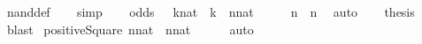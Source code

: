\begin{isabellebody}
\ nand{\isacharunderscore}{\kern0pt}def\isanewline
\ \ \isamarkupfalse%
\ simp\isanewline
\ \ \isamarkupfalse%
%
\endisatagproof
{\isafoldproof}%
%
\isadelimproof
\isanewline
%
\endisadelimproof
\isanewline
\isanewline
\isanewline
\isanewline
\isanewline
{}\isamarkupfalse%
\ {\isachardoublequoteopen}odds{}{\isachardoublequoteclose}{\isacharcolon}{\kern0pt}\ {\isachardoublequoteopen}\ {\isasymexists}\ {\isacharparenleft}{\kern0pt}k{\isacharcolon}{\kern0pt}{\isacharcolon}{\kern0pt}nat{\isacharparenright}{\kern0pt}\ {\isachardot}{\kern0pt}\ {}{\isacharasterisk}{\kern0pt}k{\isacharplus}{\kern0pt}{}\ {\isachargreater}{\kern0pt}\ {\isacharparenleft}{\kern0pt}n{\isacharcolon}{\kern0pt}{\isacharcolon}{\kern0pt}nat{\isacharparenright}{\kern0pt}{\isachardoublequoteclose}\isanewline
%
\isadelimproof
%
\endisadelimproof
%
\isatagproof
{}\isamarkupfalse%
\ {\isacharminus}{\kern0pt}\isanewline
\ \ \isamarkupfalse%
\ {\isachardoublequoteopen}{}{\isacharasterisk}{\kern0pt}n{\isacharplus}{\kern0pt}{}\ {\isachargreater}{\kern0pt}\ n{\isachardoublequoteclose}\ \isamarkupfalse%
\ auto\isanewline
\ \ \isamarkupfalse%
\ {\isacharquery}{\kern0pt}thesis\ \isamarkupfalse%
\ blast\isanewline
{}\isamarkupfalse%
%
\endisatagproof
{\isafoldproof}%
%
\isadelimproof
\isanewline
%
\endisadelimproof
\isanewline
{}\isamarkupfalse%
\ {\isachardoublequoteopen}positiveSquare{\isachardoublequoteclose}{\isacharcolon}{\kern0pt}\ {\isachardoublequoteopen}{\isacharparenleft}{\kern0pt}n{\isacharcolon}{\kern0pt}{\isacharcolon}{\kern0pt}nat{\isacharparenright}{\kern0pt}\ {\isacharasterisk}{\kern0pt}\ {\isacharparenleft}{\kern0pt}n{\isacharcolon}{\kern0pt}{\isacharcolon}{\kern0pt}nat{\isacharparenright}{\kern0pt}\ {\isasymge}\ {}{\isachardoublequoteclose}\isanewline
%
\isadelimproof
\ \ %
\endisadelimproof
%
\isatagproof
{}\isamarkupfalse%
\ auto%
\endisatagproof
{\isafoldproof}%
%
\isadelimproof
\isanewline
%
\endisadelimproof
\isanewline
\isanewline
%
\isadelimtheory
\isanewline
%
\endisadelimtheory
%
\isatagtheory
{}\isamarkupfalse%
%
\endisatagtheory
{\isafoldtheory}%
%
\isadelimtheory
%
\endisadelimtheory
%
\end{isabellebody}%
\endinput

